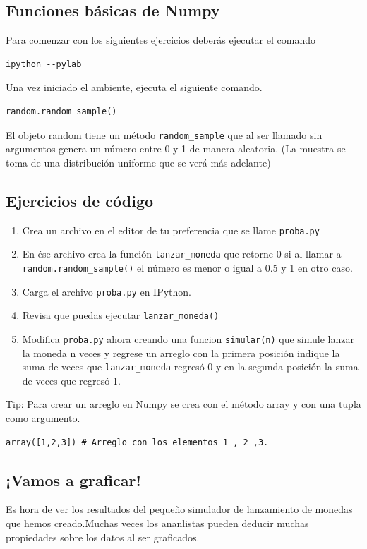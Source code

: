 \documentclass{article}
\begin{document}
\subsection{Funciones básicas de Numpy}

Para comenzar con los siguientes ejercicios deberás ejecutar el comando \begin{verbatim}
ipython --pylab
\end{verbatim}

Una vez iniciado el ambiente, ejecuta el siguiente comando.
\begin{verbatim}
random.random_sample()
\end{verbatim}

El objeto random tiene un método \verb#random_sample# que al ser llamado sin argumentos genera un número entre 0 y 1 de manera aleatoria.
(La muestra se toma de una distribución uniforme que se verá más adelante)

\subsection{Ejercicios de código}
\begin{enumerate}
\item Crea un archivo en el editor de tu preferencia que se llame \verb#proba.py#
\item En ése archivo crea la función \verb#lanzar_moneda# que retorne 0 si al llamar a \verb#random.random_sample()# el número es menor o igual a 0.5 y 1 en otro caso.
\item Carga el archivo \verb#proba.py# en IPython.
\item Revisa que puedas ejecutar \verb#lanzar_moneda()#
\item Modifica \verb#proba.py# ahora creando una funcion \verb#simular(n)# que simule lanzar la moneda n veces y regrese un arreglo con la primera posición indique la suma de veces que \verb#lanzar_moneda# regresó 0 y en la segunda posición la suma de veces que regresó 1.
\end{enumerate}
Tip:
Para crear un arreglo en Numpy se crea con el método array y con una tupla como argumento.
\begin{verbatim}
array([1,2,3]) # Arreglo con los elementos 1 , 2 ,3.
\end{verbatim}

\subsection{¡Vamos a graficar!}
Es hora de ver los resultados del pequeño simulador de lanzamiento de monedas que hemos creado.Muchas veces los ananlistas pueden deducir muchas propiedades sobre los datos al ser graficados.
\end{document}

